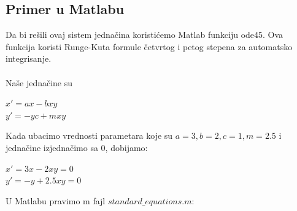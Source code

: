 \documentclass[a4paper]{article}
\begin{document}
\subsection{Primer u Matlabu}
\label{sub:std_primer}
Da bi rešili ovaj sistem jednačina koristićemo Matlab funkciju ode45. Ova funkcija koristi Runge-Kuta
formule četvrtog i petog stepena za automatsko integrisanje.\\ \\
Naše jednačine su
	\begin{center}
		$x' = ax - bxy$ \\
		$y' = -yc + mxy$
	\end{center}
Kada ubacimo vrednosti parametara koje su $a=3, b=2, c=1, m=2.5$ i jednačine izjednačimo sa 0, dobijamo:
	\begin{center}
		$x'=3x - 2xy = 0$ \\
		$y'=-y + 2.5xy = 0$
	\end{center}
U Matlabu pravimo m fajl $ standard\_equations.m $:


\end{document}
